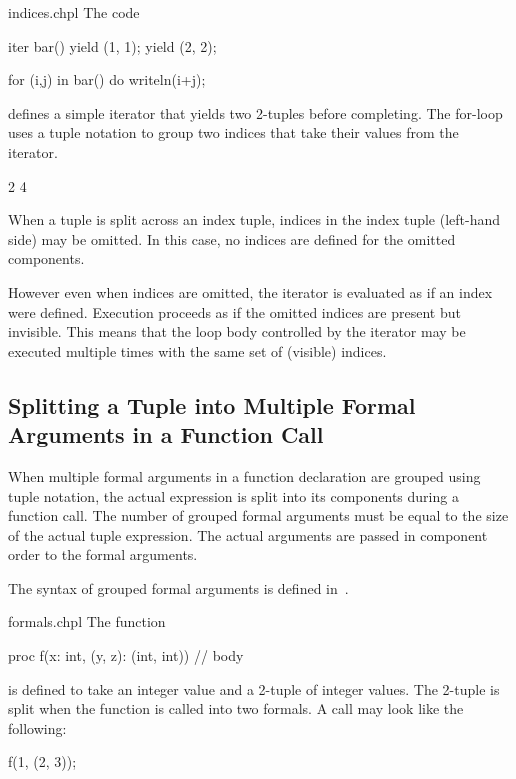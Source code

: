 \begin{chapelexample}{indices.chpl}
The code
\begin{chapel}
iter bar() {
  yield (1, 1);
  yield (2, 2);
}

for (i,j) in bar() do
  writeln(i+j);
\end{chapel}
defines a simple iterator that yields two 2-tuples before completing.
The for-loop uses a tuple notation to group two indices that take
their values from the iterator.
\begin{chapelpost}
\end{chapelpost}
\begin{chapeloutput}
2
4
\end{chapeloutput}
\end{chapelexample}

When a tuple is split across an index tuple, indices in the index
tuple (left-hand side) may be omitted.  In this case, no indices are
defined for the omitted components.

However even when indices are omitted, the iterator is
evaluated as if an index were defined.  Execution proceeds as if the
omitted indices are present but invisible.  This means that the loop body
controlled by the iterator may be executed multiple times with the
same set of (visible) indices.

\subsection{Splitting a Tuple into Multiple Formal Arguments in a Function Call}
\label{Formal_Argument_Declarations_in_a_Tuple}

When multiple formal arguments in a function declaration are grouped
using tuple notation, the actual expression is split into its
components during a function call.  The number of grouped formal
arguments must be equal to the size of the actual tuple expression.
The actual arguments are passed in component order to the formal
arguments.

The syntax of grouped formal arguments is defined
in~.

\begin{chapelexample}{formals.chpl}
The function
\begin{chapel}
proc f(x: int, (y, z): (int, int)) {
  // body
}
\end{chapel}
is defined to take an integer value and a 2-tuple of integer values.
The 2-tuple is split when the function is called into two formals.  A
call may look like the following:
\begin{chapel}
f(1, (2, 3));
\end{chapel}
\begin{chapelpost}
\end{chapelpost}
\begin{chapeloutput}
\end{chapeloutput}
\end{chapelexample}

